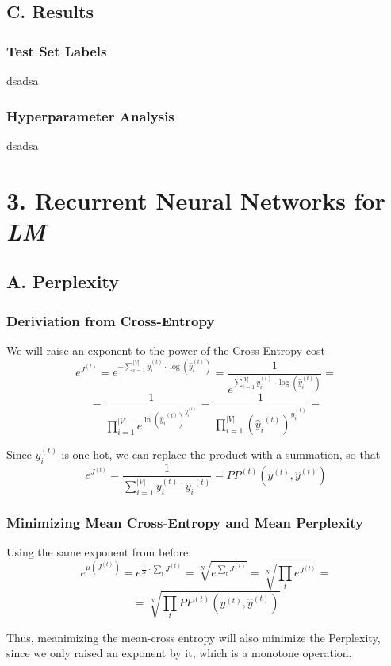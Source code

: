 \documentclass{article}
\begin{document}
\subsection*{C. Results}
\subsubsection*{Test Set Labels}
dsadsa

\subsubsection*{Hyperparameter Analysis}
dsadsa



\section*{3. Recurrent Neural Networks for \emph{LM}}
\subsection*{A. Perplexity}
\subsubsection*{Deriviation from Cross-Entropy}
We will raise an exponent to the power of the Cross-Entropy cost
$$
	e^{J^{(t)}} = e^{-\sum_{i=1}^{|V|}{y_i^{(t)}}\cdot \log \left(\hat y_i^{(t)}\right)} = \frac {1} {e^{\sum_{i=1}^{|V|}{y_i^{(t)}}\cdot \log \left(\hat y_i^{(t)}\right)}} =
$$
$$
	= \frac {1} {\prod_{i=1}^{|V|}{e^{ \ln \left({\hat y_i}^{(t)} \right)^{y_i^{(t)}}}}} = \frac {1} {\prod_{i=1}^{|V|}{\left({\hat y_i}^{(t)} \right)^{y_i^{(t)}}}}= 
$$

Since $y_i^{(t)}$ is one-hot, we can replace the product with a summation, so that
$$
	e^{J^{(t)}} = \frac {1} {\sum_{i=1}^{|V|}{y_i^{(t)}\cdot {\hat y_i}^{(t)}}} = PP^{(t)}\left(y^{(t)}, {\hat y}^{(t)}\right)
$$

\subsubsection*{Minimizing Mean Cross-Entropy and Mean Perplexity}
Using the same exponent from before:
$$
	e^{\mu \left(J^{(t)}\right)} = e^{\frac {1}{N} \cdot \sum_t {J^{(t)}}} = \sqrt[N]{e^{\sum_t {J^{(t)}}}} = \sqrt[N]{\prod_t {e^{J^{(t)}}}} = 
$$
$$
	= \sqrt[N]{\prod_t {PP^{(t)} \left(y^{(t)}, {\hat y}^{(t)}\right)}}
$$

Thus, meanimizing the mean-cross entropy will also minimize the Perplexity, since we only raised an exponent by it, which is a monotone operation.
\end{document}
